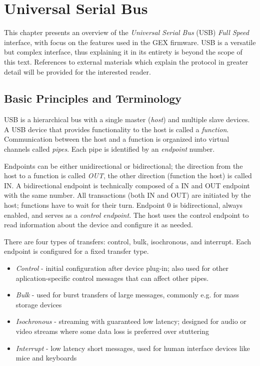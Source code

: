 \chapter{Universal Serial Bus}

This chapter presents an overview of the \textit{Universal Serial Bus} (USB) \textit{Full Speed} interface, with focus on the features used in the GEX firmware. USB is a versatile but complex interface, thus explaining it in its entirety is beyond the scope of this text. References to external materials which explain the protocol in greater detail will be provided for the interested reader.

\section{Basic Principles and Terminology}


USB is a hierarchical bus with a single master (\textit{host}) and multiple slave devices. A USB device that provides functionality to the host is called a \textit{function}. Communication between the host and a function is organized into virtual channels called \textit{pipes}. Each pipe is identified by an \textit{endpoint} number. 

Endpoints can be either unidirectional or bidirectional; the direction from the host to a function is called \textit{OUT}, the other direction (function the host) is called IN. A bidirectional endpoint is technically composed of a IN and OUT endpoint with the same number. All transactions (both IN and OUT) are initiated by the host; functions have to wait for their turn. Endpoint 0 is bidirectional, always enabled, and serves as a \textit{control endpoint}. The host uses the control endpoint to read information about the device and configure it as needed.

There are four types of transfers: control, bulk, isochronous, and interrupt. Each endpoint is configured for a fixed transfer type. 

\begin{itemize}
	\item \textit{Control} - initial configuration after device plug-in; also used for other aplication-specific control messages that can affect other pipes.
	\item \textit{Bulk} - used for burst transfers of large messages, commonly e.g. for mass storage devices
	\item \textit{Isochronous} - streaming with guaranteed low latency; designed for audio or video streams where some data loss is preferred over stuttering
	\item \textit{Interrupt} - low latency short messages, used for human interface devices like mice and keyboards
\end{itemize}

